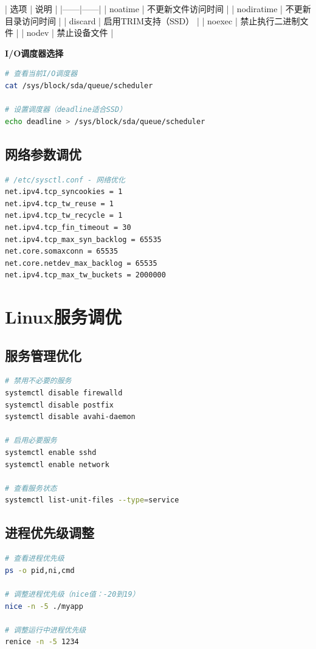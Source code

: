 \documentclass[12pt,UTF8]{ctexbook}
\begin{document}
| 选项 | 说明 |
|------|------|
| noatime | 不更新文件访问时间 |
| nodiratime | 不更新目录访问时间 |
| discard | 启用TRIM支持（SSD） |
| noexec | 禁止执行二进制文件 |
| nodev | 禁止设备文件 |

\textbf{I/O调度器选择}
\begin{lstlisting}[language=bash]
# 查看当前I/O调度器
cat /sys/block/sda/queue/scheduler

# 设置调度器（deadline适合SSD）
echo deadline > /sys/block/sda/queue/scheduler
\end{lstlisting}

\subsection*{网络参数调优}

\begin{lstlisting}[language=bash]
# /etc/sysctl.conf - 网络优化
net.ipv4.tcp_syncookies = 1
net.ipv4.tcp_tw_reuse = 1
net.ipv4.tcp_tw_recycle = 1
net.ipv4.tcp_fin_timeout = 30
net.ipv4.tcp_max_syn_backlog = 65535
net.core.somaxconn = 65535
net.core.netdev_max_backlog = 65535
net.ipv4.tcp_max_tw_buckets = 2000000
\end{lstlisting}

\section{Linux服务调优}
\label{sec:service-tuning}

\subsection*{服务管理优化}

\begin{lstlisting}[language=bash]
# 禁用不必要的服务
systemctl disable firewalld
systemctl disable postfix
systemctl disable avahi-daemon

# 启用必要服务
systemctl enable sshd
systemctl enable network

# 查看服务状态
systemctl list-unit-files --type=service
\end{lstlisting}

\subsection*{进程优先级调整}

\begin{lstlisting}[language=bash]
# 查看进程优先级
ps -o pid,ni,cmd

# 调整进程优先级（nice值：-20到19）
nice -n -5 ./myapp

# 调整运行中进程优先级
renice -n -5 1234
\end{lstlisting}
\end{document}
